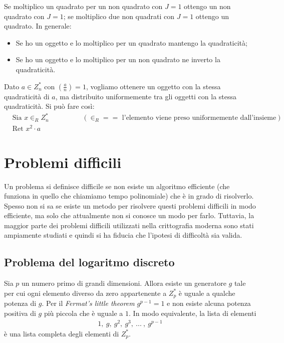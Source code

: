 Se moltiplico un quadrato per un non quadrato con $J=1$ ottengo un non quadrato con $J=1$; se moltiplico due non quadrati con $J=1$ ottengo un quadrato. In generale:
\begin{itemize}
    \item Se ho un oggetto e lo moltiplico per un quadrato mantengo la quadraticità;
    \item Se ho un oggetto e lo moltiplico per un non quadrato ne inverto la quadraticità.
\end{itemize}

\noindent Dato $a \in Z_n^*$ con $\left(\frac{a}{n}\right) = 1$, vogliamo ottenere un oggetto con la stessa quadraticità di $a$, ma distribuito uniformemente tra gli oggetti con la stessa quadraticità. Si può fare così:
\begin{align*}
    &\text{Sia } x \in_R Z_n^* \hspace{2cm} (\in_R == \text{ l'elemento viene preso uniformemente dall'insieme})\\
    &\text{Ret } x^2 \cdot a
\end{align*}

\section{Problemi difficili}
Un problema si definisce difficile se non esiste un algoritmo efficiente (che funziona in quello che chiamiamo tempo polinomiale) che è in grado di risolverlo. Spesso non si sa se esiste un metodo per risolvere questi problemi difficili in modo efficiente, ma solo che attualmente non si conosce un modo per farlo. Tuttavia, la maggior parte dei problemi difficili utilizzati nella crittografia moderna sono stati ampiamente studiati e quindi si ha fiducia che l'ipotesi di difficoltà sia valida.

\subsection{Problema del logaritmo discreto}
Sia $p$ un numero primo di grandi dimensioni. Allora esiste un generatore $g$ tale per cui ogni elemento diverso da zero appartenente a $Z_p^*$ è uguale  a qualche potenza di $g$. Per il \textit{Fermat’s little theorem} $g^{p-1} = 1$ e non esiste alcuna potenza positiva di $g$ più piccola che è uguale a $1$. In modo equivalente, la lista di elementi
\begin{align*}
    1, \ g, \ g^2, \ g^3, \ ... \ , \ g^{p-1}
\end{align*}
\noindent è una lista completa degli elementi di $Z_p^*$.

